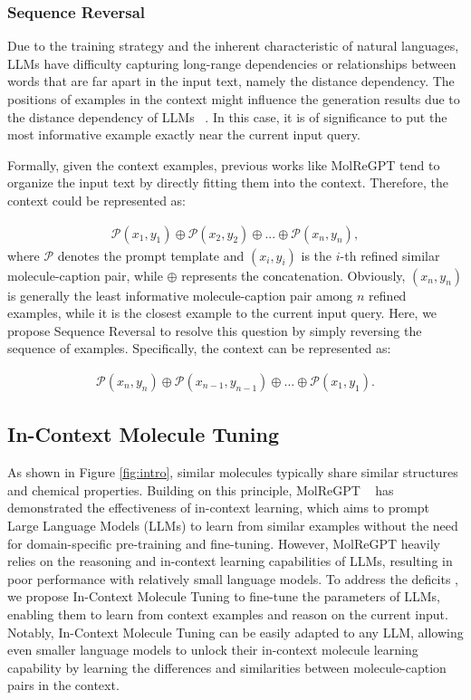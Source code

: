 \subsubsection{Sequence Reversal}
Due to the training strategy and the inherent characteristic of natural languages, LLMs have difficulty capturing long-range dependencies or relationships between words that are far apart in the input text, namely the distance dependency. The positions of examples in the context might influence the generation results due to the distance dependency of LLMs ~\cite{frermann-etal-2023-conflicts}. In this case, it is of significance to put the most informative example exactly near the current input query.

Formally, given the context examples, previous works like MolReGPT tend to organize the input text by directly fitting them into the context. Therefore, the context could be represented as:

{\small
\vskip -0.2in
\begin{align}
    \mathcal{P}(x_1,y_1)\oplus\mathcal{P}(x_2,y_2)\oplus ... \oplus \mathcal{P}(x_n,y_n),
\end{align}
\vskip -0.1in}
where $\mathcal{P}$ denotes the prompt template and $(x_i, y_i)$ is the $i$-th refined similar molecule-caption pair, while $\oplus$ represents the concatenation.
Obviously, $(x_n,y_n)$ is generally the least informative molecule-caption pair among $n$ refined examples, while it is the closest example to the current input query. 
Here, we propose Sequence Reversal to resolve this question by simply reversing the sequence of examples. Specifically, the context can be represented as:

{\small
\vskip -0.2in
\begin{align}
    \mathcal{P}(x_n,y_n)\!\oplus\!\mathcal{P}(x_{n-1},y_{n-1})\!\oplus...\oplus\! \mathcal{P}(x_1,y_1).
\end{align}
}

\subsection{In-Context Molecule Tuning}
As shown in Figure \ref{fig:intro}, similar molecules typically share similar structures and chemical properties. Building on this principle, MolReGPT ~\cite{li2023empowering} has demonstrated the effectiveness of in-context learning, which aims to prompt Large Language Models (LLMs) to learn from similar examples without the need for domain-specific pre-training and fine-tuning. However, MolReGPT heavily relies on the reasoning and in-context learning capabilities of LLMs, resulting in poor performance with relatively small language models.
To address the deficits 
, we propose In-Context Molecule Tuning to fine-tune the parameters of LLMs, enabling them to learn from context examples and reason on the current input.
Notably, In-Context Molecule Tuning can be easily adapted to any LLM, allowing even smaller language models to unlock their in-context molecule learning capability by learning the differences and similarities between molecule-caption pairs in the context. 


